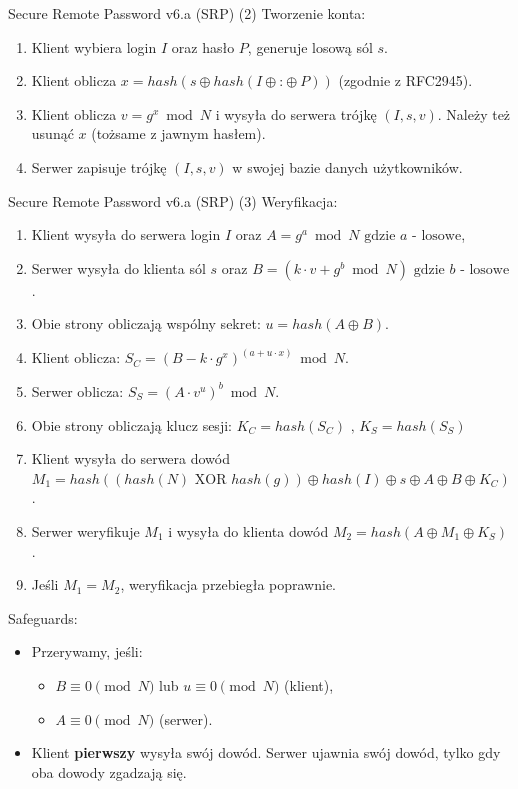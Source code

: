 \documentclass[polish,envcountsect,10pt]{beamer}
\begin{document}
\begin{frame}{Secure Remote Password v6.a (SRP) (2)}
    Tworzenie konta:
    \begin{enumerate}
        \item Klient wybiera login $I$ oraz hasło $P$, generuje losową sól $s$.
        \item Klient oblicza $x = hash(s \oplus hash(I \oplus \text{:} \oplus P))$ (zgodnie z RFC2945).
        \item Klient oblicza $v = g^{x} \bmod{N}$ i wysyła do serwera trójkę $(I, s, v)$. Należy też usunąć $x$ (tożsame z jawnym hasłem).
        \item Serwer zapisuje trójkę $(I, s, v)$ w swojej bazie danych użytkowników.
    \end{enumerate}
\end{frame}

\begin{frame}{Secure Remote Password v6.a (SRP) (3)}
    Weryfikacja:
    \begin{enumerate}
        \item Klient wysyła do serwera login $I$ oraz $A = g^{a} \bmod{N} \text{ gdzie } a \text { - losowe}$,
        \item Serwer wysyła do klienta sól $s$ oraz $B = (k\cdot v + g^{b} \bmod{N}) \text{ gdzie } b \text { - losowe}$.
        \item Obie strony obliczają wspólny sekret: $u = hash(A \oplus B)$.
        \item Klient oblicza: $S_{C} = (B - k\cdot g^{x})^{(a + u\cdot x)} \bmod{N}$.
        \item Serwer oblicza: $S_{S} = (A\cdot v^{u})^{b} \bmod{N}$.
        \item Obie strony obliczają klucz sesji: $ K_{C} = hash(S_{C})  \text{ , }  K_{S} = hash(S_{S}) $
        \item Klient wysyła do serwera dowód $M_{1} = hash( (hash(N) \text{ XOR } hash(g) ) \oplus hash(I) \oplus s \oplus A \oplus B \oplus K_{C})$.
        \item Serwer weryfikuje $M_{1}$ i wysyła do klienta dowód $M_{2} = hash(A \oplus M_{1} \oplus K_{S})$.
        \item Jeśli $M_{1} = M_{2}$, weryfikacja przebiegła poprawnie.
    \end{enumerate}
    
    Safeguards: 
    \begin{itemize}
        \item Przerywamy, jeśli:
            \begin{itemize}
                \item $B \equiv 0 \pmod{N}$ lub $u \equiv 0 \pmod{N}$ (klient),
                \item $A \equiv 0 \pmod{N}$ (serwer).
            \end{itemize} 
        \item Klient \textbf{pierwszy} wysyła swój dowód. Serwer ujawnia swój dowód, tylko gdy oba dowody zgadzają się.
    \end{itemize}
\end{frame}
\end{document}
